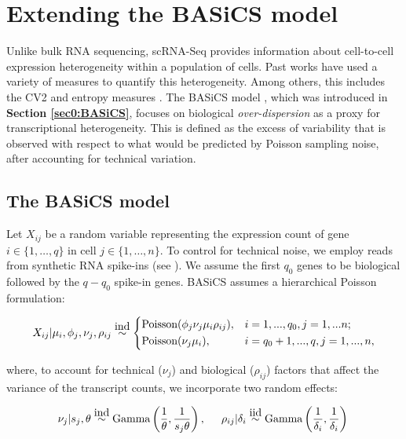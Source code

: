 
\section{Extending the  BASiCS model}

Unlike bulk RNA sequencing, scRNA-Seq provides information about cell-to-cell expression heterogeneity within a population of cells. 
Past works have used a variety of measures to quantify this heterogeneity. Among others, this includes the \gls{CV2} \citep{Brennecke2013} and entropy measures \citep{Richard2016}. 
The BASiCS model \citep{Vallejos2015BASiCS, Vallejos2016}, which was introduced in \textbf{Section \ref{sec0:BASiCS}}, focuses on biological \textit{over-dispersion} as a proxy for transcriptional heterogeneity. 
This is defined as the excess of variability that is observed with respect to what would be predicted by Poisson sampling noise, after accounting for technical variation. 

\subsection{The BASiCS model}

Let $X_{ij}$ be a random variable representing the expression count of gene $i \in \{1, \ldots, q\}$ in cell $j \in \{ 1, \ldots ,n\}$.  
To control for technical noise, we employ reads from synthetic RNA spike-ins (see \citep{Jiang2011}). 
We assume the first $q_0$ genes to be biological followed by the $q-q_0$ spike-in genes. 
BASiCS assumes a hierarchical Poisson formulation: 

\begin{equation} \label{eq::PoissonBASiCS}
 X_{ij}|\mu_i,\phi_j,\nu_j,\rho_{ij} \stackrel{\mbox{ind}}{\sim}
 \left\lbrace
  \begin{aligned}
    &\text{Poisson}(\phi_j\nu_j\mu_i\rho_{ij}), && i=1,...,q_0,j=1,...n;  \\ 
    &\text{Poisson}(\nu_j\mu_i), && i=q_0+1,...,q,j=1,...,n,    	    
  \end{aligned}
\right.
\end{equation} 

where, to account for technical ($\nu_j$) and biological ($\rho_{ij}$) factors that affect the variance of the transcript counts, we incorporate two random effects: 

\begin{equation} \label{eq::RandomEffectsBASiCS}
\nu_j|s_j,\theta \stackrel{\mbox{ind}}{\sim} \text{Gamma}\left(\frac{1}{\theta},\frac{1}{s_j\theta}\right), \hspace{0.5cm} \rho_{ij}|\delta_i  \stackrel{\mbox{iid}}{\sim} \text{Gamma}\left(\frac{1}{\delta_i},\frac{1}{\delta_i}\right)\\
\end{equation} 


